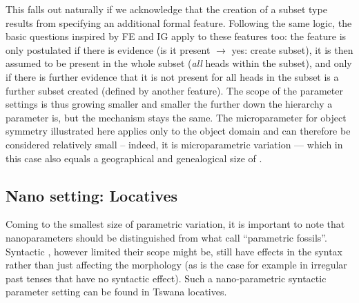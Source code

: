 \documentclass[output=paper]{langsci/langscibook}
\begin{document}
This falls out naturally if we acknowledge that the creation of a subset type
results from specifying an additional formal feature. Following the same logic,
the basic questions inspired by \gls{FE} and \gls{IG} apply to these features too: the
feature is only postulated if there is evidence (is it present $\to$ yes:
create subset), it is then assumed to be present in the whole subset
(\emph{all} heads within the subset), and only if there is further evidence
that it is not present for all heads in the subset is a further subset created
(defined by another feature). The scope of the parameter settings is thus
growing smaller and smaller the further down the hierarchy a parameter is, but
the mechanism stays the same. The microparameter for object symmetry
illustrated here applies only to the object domain and can therefore be
considered relatively small -- indeed, it is microparametric variation ---
which in this case also equals a geographical and genealogical size of
.

\subsection{Nano setting: Locatives}\label{sub:3.2.4}

Coming to the smallest size of parametric variation, it is important to note
that nanoparameters should be distinguished from what \citet[9]{BibRob2015b}
call “parametric fossils”. Syntactic , however limited their scope
might be, still have effects in the syntax rather than just affecting the
morphology (as is the case for example in irregular past tenses that have no
syntactic effect). Such a nano-parametric syntactic parameter setting can be
found in Tswana locatives.
\end{document}
